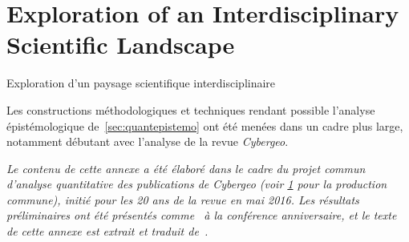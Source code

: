 


\newpage


\section{Exploration of an Interdisciplinary Scientific Landscape}{Exploration d'un paysage scientifique interdisciplinaire}

\label{app:sec:cybergeo}





Les constructions méthodologiques et techniques rendant possible l'analyse épistémologique de~\ref{sec:quantepistemo} ont été menées dans un cadre plus large, notamment débutant avec l'analyse de la revue \textit{Cybergeo}.

 
\stars

\textit{Le contenu de cette annexe a été élaboré dans le cadre du projet commun d'analyse quantitative des publications de Cybergeo (voir \ref{} pour la production commune), initié pour les 20 ans de la revue en mai 2016. Les résultats préliminaires ont été présentés comme~\cite{raimbault2016indirect} à la conférence anniversaire, et le texte de cette annexe est extrait et traduit de~\cite{raimbault2017exploration}.}


\stars





